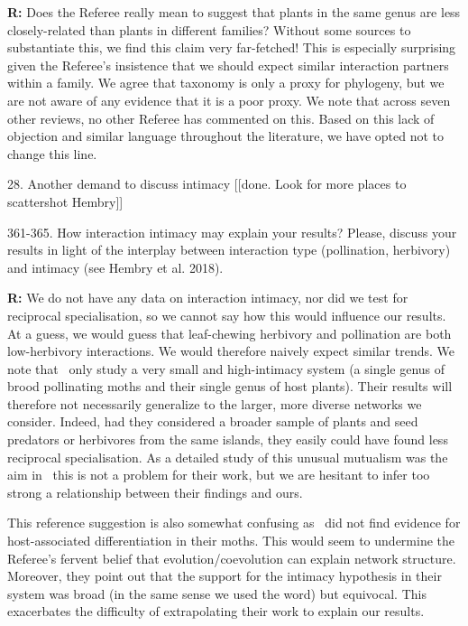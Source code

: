\documentclass[12pt]{letter}
\newenvironment{refquote}{\bigskip \begin{it}}{\end{it}\smallskip}
\begin{document}
		\textbf{R:} Does the Referee really mean to suggest that plants in the same genus are less closely-related than plants in different families? Without some sources to substantiate this, we find this claim very far-fetched! This is especially surprising given the Referee's insistence that we should expect similar interaction partners within a family. We agree that taxonomy is only a proxy for phylogeny, but we are not aware of any evidence that it is a poor proxy. We note that across seven other reviews, no other Referee has commented on this. Based on this lack of objection and similar language throughout the literature, we have opted not to change this line.



	28. Another demand to discuss intimacy [[done. Look for more places to scattershot Hembry]]

		\begin{refquote}
			361-365. How interaction intimacy may explain your results? Please, discuss your results in light of the interplay between interaction type (pollination, herbivory) and intimacy (see Hembry et al. 2018).
		\end{refquote}


		\textbf{R:} We do not have any data on interaction intimacy, nor did we test for reciprocal specialisation, so we cannot say how this would influence our results. At a guess, we would guess that leaf-chewing herbivory and pollination are both low-herbivory interactions. We would therefore naively expect similar trends. We note that~\citet{Hembry2018} only study a very small and high-intimacy system (a single genus of brood pollinating moths and their single genus of host plants). Their results will therefore not necessarily generalize to the larger, more diverse networks we consider. Indeed, had they considered a broader sample of plants and seed predators or herbivores from the same islands, they easily could have found less reciprocal specialisation. As a detailed study of this unusual mutualism was the aim in~\citet{Hembry2018} this is not a problem for their work, but we are hesitant to infer too strong a relationship between their findings and ours.


		This reference suggestion is also somewhat confusing as~\citet{Hembry2018} did not find evidence for host-associated differentiation in their moths. This would seem to undermine the Referee's fervent belief that evolution/coevolution can explain network structure. Moreover, they point out that the support for the intimacy hypothesis  in their system was broad (in the same sense we used the word) but equivocal. This exacerbates the difficulty of extrapolating their work to explain our results.
\end{document}
